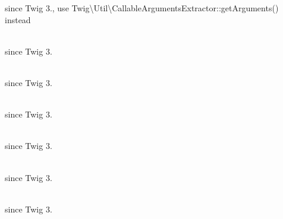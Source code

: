 \begin{DoxyRefList}
\label{deprecated__deprecated000030}%
%
since Twig 3., use Twig\textbackslash{}\+Util\textbackslash{}\+Callable\+Arguments\+Extractor::\+get\+Arguments() instead  
\item[{\parbox[t]{\linewidth}{Global(e) \doxylink{class_twig_1_1_node_1_1_expression_1_1_call_expression_a9b4f9125eed2da607810d35b6eba1c48}{Call\+Expression::\+normalize\+Name} (string \$name)}}]\hfill \\
\label{deprecated__deprecated000031}%
%
since Twig 3.  
\item[{\parbox[t]{\linewidth}{Global(e) \doxylink{class_twig_1_1_environment_a7e84fd2f4a105b68c7167060ae59b87d}{Environment::\+merge\+Globals} (array \$context)}}]\hfill \\
\label{deprecated__deprecated000006}%
%
since Twig 3.  
\item[{\parbox[t]{\linewidth}{Global(e) \doxylink{class_twig_1_1_extension_1_1_escaper_extension_a09ec5b8046ea52adaf5c62f04aa6f6c0}{Escaper\+Extension::\+add\+Safe\+Class} (string \$class, array \$strategies)}}]\hfill \\
\label{deprecated__deprecated000029}%
%
since Twig 3.  
\item[{\parbox[t]{\linewidth}{Global(e) \doxylink{class_twig_1_1_extension_1_1_escaper_extension_a98b08ee8d76d2e8b51f88aadf54c57f3}{Escaper\+Extension::\+get\+Escapers} ()}}]\hfill \\
\label{deprecated__deprecated000027}%
%
since Twig 3.  
\item[{\parbox[t]{\linewidth}{Global(e) \doxylink{class_twig_1_1_extension_1_1_escaper_extension_afd1d0eea505ddebb1f41296a93fa67f8}{Escaper\+Extension::\+set\+Environment} (\doxylink{class_twig_1_1_environment}{Environment} \$environment)}}]\hfill \\
\label{deprecated__deprecated000024}%
%
since Twig 3.  
\item[{\parbox[t]{\linewidth}{Global(e) \doxylink{class_twig_1_1_extension_1_1_escaper_extension_ab7b464eba8eb6b2adc78fa6e7cdf67b2}{Escaper\+Extension::\+set\+Escaper} (\$strategy, callable \$callable)}}]\hfill \\
\label{deprecated__deprecated000026}%
%
since Twig 3.  
\item[{\parbox[t]{\linewidth}{Global(e) \doxylink{class_twig_1_1_extension_1_1_escaper_extension_aae0d3ef4b9ea31ea3b17549237b6884e}{Escaper\+Extension::\+set\+Escaper\+Runtime} (\doxylink{class_twig_1_1_runtime_1_1_escaper_runtime}{Escaper\+Runtime} \$escaper)}}]\hfill \\

\end{DoxyRefList}
